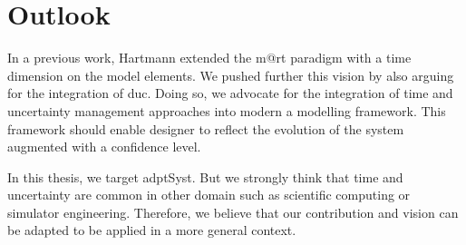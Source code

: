 \section{Outlook}

In a previous work, Hartmann \etal \cite{DBLP:conf/seke/0001FNMKT14, DBLP:conf/models/Moawad0FNKT15} extended the \gls{m@rt} paradigm with a time dimension on the \gls{model} elements.
We pushed further this vision by also arguing for the integration of \gls{duc}.
Doing so, we advocate for the integration of time and uncertainty management approaches into modern a modelling framework.
This framework should enable designer to reflect the evolution of the system augmented with a confidence level.

In this thesis, we target \gls{adptSyst}.
But we strongly think that time and uncertainty are common in other domain such as scientific computing or simulator engineering.
Therefore, we believe that our contribution and vision can be adapted to be applied in a more general context. 